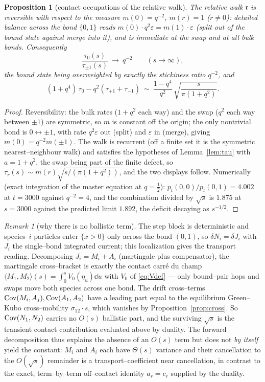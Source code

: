 \documentclass[11pt]{article}
\theoremstyle{plain}
\newtheorem{proposition}[theorem]{Proposition}
\theoremstyle{definition}
\theoremstyle{remark}
\newtheorem{remark}[theorem]{Remark}
\newcommand{\eps}{\varepsilon}\newcommand{\Exp}{\mathrm{Exp}}
\begin{document}
\begin{proposition}[contact occupations of the relative walk]\label{prop:occ}
The relative walk $\mathfrak r$ is reversible with respect to the measure
$m(0)=q^{-2}$, $m(r)=1$ \textup($r\ne0$\textup): detailed balance across the bond
$\{0,1\}$ reads $m(0)\cdot q^2\eps=m(1)\cdot\eps$ \textup(split out of the bound state
against merge into it\textup), and is immediate at the swap and at all bulk bonds.
Consequently
\[
  \frac{\tau_0(s)}{\tau_{\pm1}(s)}\ \longrightarrow\ q^{-2}\qquad(s\to\infty),
\]
the bound state being overweighted by exactly the stickiness ratio $q^{-2}$, and
\[
  (1+q^4)\,\tau_0-q^2(\tau_{+1}+\tau_{-1})\ \sim\
  \frac{1-q^4}{q^{2}}\,\sqrt{\frac{s}{\pi(1+q^2)}}.
\]
\end{proposition}
\begin{proof}
Reversibility: the bulk rates ($1+q^2$ each way) and the swap ($q^2$ each way between
$\pm1$) are symmetric, so $m$ is constant off the origin; the only nontrivial bond is
$0\leftrightarrow\pm1$, with rate $q^2\eps$ out (split) and $\eps$ in (merge), giving
$m(0)=q^{-2}m(\pm1)$. The walk is recurrent (off a finite set it is the symmetric
nearest--neighbour walk) and satisfies the hypotheses of Lemma~\ref{lem:tau} with
$a=1+q^2$, the swap being part of the finite defect, so
$\tau_r(s)\sim m(r)\sqrt{s/(\pi(1+q^2))}$, and the two displays follow.
Numerically (exact integration of the master equation at $q=\tfrac12$):
$p_t(0,0)/p_t(0,1)=4.002$ at $t=3000$ against $q^{-2}=4$, and the combination divided
by $\sqrt s$ is $1.875$ at $s=3000$ against the predicted limit $1.892$, the deficit
decaying as $s^{-1/2}$.
\end{proof}

\begin{remark}[why there is no ballistic term]\label{rem:noballistic}
The step block is deterministic and species--$i$ particles enter $\{x>0\}$ only across
the bond $(0,1)$, so $\delta N_i=\delta J_i$ with $J_i$ the single--bond integrated
current; this localization gives the transport reading. Decomposing
$J_i=M_i+A_i$ (martingale plus compensator), the martingale cross--bracket is exactly the
contact carr\'e du champ $\langle M_1,M_2\rangle(s)=\int_0^s V_0(\eta_u)\dd u$ with $V_0$
of \eqref{eq:Vdef} --- only bound--pair hops and swaps move both species across one bond.
The drift cross--terms $\operatorname{Cov}(M_i,A_j),\operatorname{Cov}(A_1,A_2)$ have a leading part equal to the
equilibrium Green--Kubo cross--mobility $\sigma_{12}\cdot s$, which vanishes by
Proposition~\ref{prop:cross}. So $\operatorname{Cov}(N_1,N_2)$ carries no $O(s)$ ballistic part, and
the surviving $\sqrt s$ is the transient contact contribution evaluated above by duality.
The forward decomposition thus explains the absence of an $O(s)$ term but does not
\emph{by itself} yield the constant: $M_i$ and $A_i$ each have $\Theta(s)$ variance and
their cancellation to the $O(\sqrt s)$ remainder is a transport--coefficient near
cancellation, in contrast to the exact, term--by--term off--contact identity
$a_r=c_r$ supplied by the duality.
\end{remark}
\end{document}
